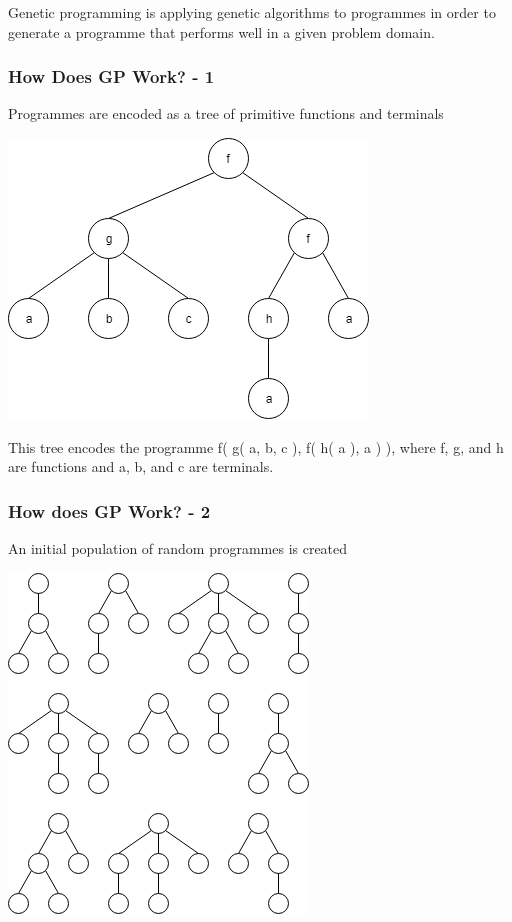 \documentclass{beamer}
\begin{document}
\begin{frame}
\begin{frame}
			Genetic programming is applying genetic algorithms to programmes in order
			to generate a programme that performs well in a given problem domain.
		
		\end{frame}
	
		\begin{frame}
		
			\frametitle{How Does GP Work? - 1}
			
			Programmes are encoded as a tree of primitive functions and terminals
			
			\begin{center}
				
				\includegraphics[scale=0.5]{resources/1_gp_example_tree}
				
				This tree encodes the programme f( g( a, b, c ), f( h( a ), a ) ), where f, g, and h are functions and a, b, and c are terminals.
				
			\end{center}
			
			
		
		\end{frame}
	
		\begin{frame}
			
			\frametitle{How does GP Work? - 2}
			
			\begin{center}
				
				An initial population of random programmes is created
				
				\includegraphics[scale=0.4]{resources/2_gp_example_population}
				

\end{center}
\end{frame}
\end{frame}
\end{document}
